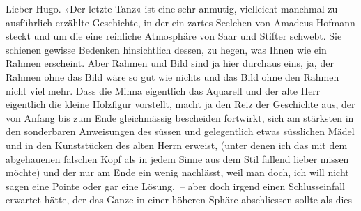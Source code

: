 \pstart\center{}Lieber Hugo.\pend\vspace{0.5em}
\pstart
           »Der letzte Tanz« ist eine sehr anmutig,
               vielleicht manchmal zu ausführlich erzählte Geschichte, in der ein zartes Seelchen
               von Amadeus Hofmann steckt und um die eine
               reinliche Atmosphäre von Saar und Stifter schwebt. Sie schienen gewisse Bedenken
               hinsichtlich dessen, zu hegen, was Ihnen wie ein Rahmen erscheint. Aber Rahmen und
               Bild sind ja hier durchaus eins, ja, der Rahmen ohne das Bild wäre so gut wie nichts
               und das Bild ohne den Rahmen nicht viel mehr. Dass die Minna eigentlich das Aquarell und der alte
               Herr eigentlich die kleine Holzfigur vorstellt, macht ja den Reiz der Geschichte aus,
               der von Anfang bis zum Ende gleichmässig bescheiden fortwirkt, sich am stärksten in
               den sonderbaren Anweisungen des süssen und gelegentlich etwas süsslichen Mädel und in
               den Kunststücken des alten {\pb}Herrn erweist, (unter denen ich
               das mit dem abgehauenen falschen Kopf als in jedem Sinne aus dem Stil fallend lieber
               missen möchte) und der nur am Ende ein wenig nachlässt, weil man doch, ich will nicht
               sagen eine Pointe oder gar eine Lösung, – aber doch irgend einen Schlusseinfall
               erwartet hätte, der das Ganze in einer höheren Sphäre abschliessen sollte als dies
